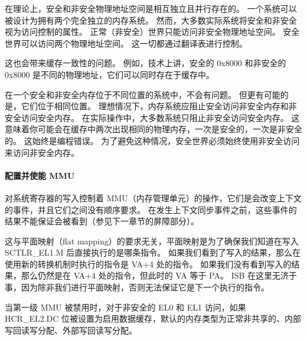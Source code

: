 在理论上，安全和非安全物理地址空间是相互独立且并行存在的。
一个系统可以被设计为拥有两个完全独立的内存系统。
然而，大多数实际系统将安全和非安全视为访问控制的属性。
正常（非安全）世界只能访问非安全物理地址空间。
安全世界可以访问两个物理地址空间。
这一切都通过翻译表进行控制。


这也会带来缓存一致性的问题。
例如，技术上讲，安全的 0x8000 和非安全的 0x8000 是不同的物理地址，它们可以同时存在于缓存中。

在一个安全和非安全内存位于不同位置的系统中，不会有问题。
但更有可能的是，它们位于相同位置。
理想情况下，内存系统应阻止安全访问非安全内存和非安全访问安全内存。
在实际操作中，大多数系统只阻止非安全访问安全内存。
这意味着你可能会在缓存中两次出现相同的物理内存，一次是安全的，一次是非安全的。
这始终是编程错误。
为了避免这种情况，安全世界必须始终使用非安全访问来访问非安全内存。

\paragraph*{配置并使能 MMU}

对系统寄存器的写入控制着 MMU（内存管理单元）的操作，它们是会改变上下文的事件，并且它们之间没有顺序要求。
在发生上下文同步事件之前，这些事件的结果不能保证会被看到（参见下一章节的屏障部分）。


这与平面映射（flat mapping）的要求无关，平面映射是为了确保我们知道在写入 SCTLR\_EL1.M 后直接执行的是哪条指令。
如果我们看到了写入的结果，那么在使用新的转换机制时执行的指令是 VA+4 处的指令。
如果我们没有看到写入的结果，那么仍然是在 VA+4 处的指令，但此时的 VA 等于 PA。
ISB 在这里无济于事，因为除非我们进行平面映射，否则无法保证它是下一个执行的指令。

当第一级 MMU 被禁用时，对于非安全的 EL0 和 EL1 访问，如果 HCR\_EL2.DC 位被设置为启用数据缓存，默认的内存类型为正常非共享的、内部写回读写分配、外部写回读写分配。

